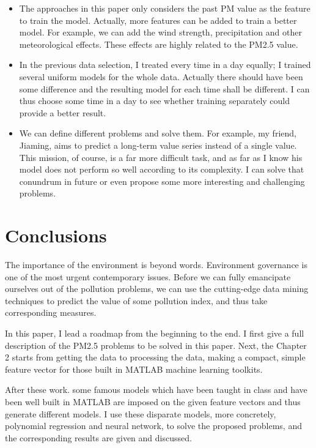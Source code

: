\documentclass{sig-alternate}
\begin{document}
\begin{itemize}
    \item The approaches in this paper only considers the past PM value as the feature to train the model. Actually, more features can be added to train a better model. For example, we can add the wind strength, precipitation and other meteorological effects. These effects are highly related to the PM2.5 value.
    \item In the previous data selection, I treated every time in a day equally; I trained several uniform models for the whole data. Actually there should have been some difference and the resulting model for each time shall be different. I can thus choose some time in a day to see whether training separately could provide a better result.
    \item We can define different problems and solve them. For example, my friend, Jiaming, aims to predict a long-term value series instead of a single value. This mission, of course, is a far more difficult task, and as far as I know his model does not perform so well according to its complexity. I can solve that conundrum in future or even propose some more interesting and challenging problems.
\end{itemize}

\section{Conclusions}
The importance of the environment is beyond words. Environment governance is one of the most urgent contemporary issues. Before we can fully emancipate ourselves out of the pollution problems, we can use the cutting-edge data mining techniques to predict the value of some pollution index, and thus take corresponding measures.

In this paper, I lead a roadmap from the beginning to the end. I first give a full description of the PM2.5 problems to be solved in this paper. Next, the Chapter 2 starts from getting the data to processing the data, making a compact, simple feature vector for those built in MATLAB machine learning toolkits.

After these work. some famous models which have been taught in class and have been well built in MATLAB are imposed on the given feature vectors and thus generate different models. I use these disparate models, more concretely, polynomial regression and neural network, to solve the proposed problems, and the corresponding results are given and discussed.
\end{document}
